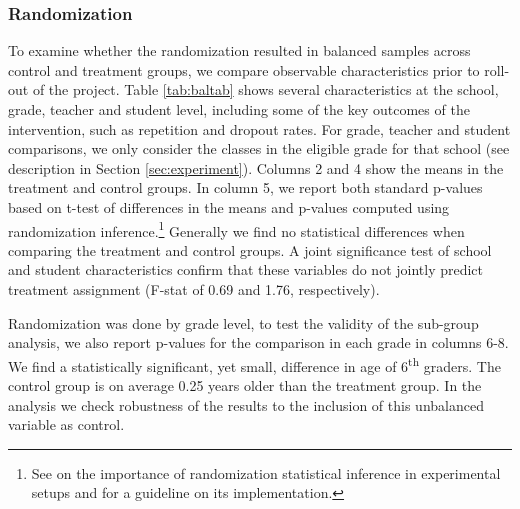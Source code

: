 \documentclass[11pt,a4paper]{article}
\begin{document}
\subsubsection*{Randomization}
To examine whether the randomization resulted in balanced samples across control and treatment groups, we compare observable characteristics prior to roll-out of the project. Table \ref{tab:baltab} shows several characteristics at the school, grade, teacher and student level, including some of the key outcomes of the intervention, such as repetition and dropout rates. For grade, teacher and student comparisons, we only consider the classes in the eligible grade for that school (see description in Section \ref{sec:experiment}). Columns 2 and 4 show the means in the treatment and control groups. In column 5, we report both standard p-values based on t-test of differences in the means and p-values computed using randomization inference.\footnote{See \cite{young2019channelling} on the importance of randomization statistical inference in experimental setups and \cite{hess2017randomization} for a guideline on its implementation.} Generally we find no statistical differences when comparing the treatment and control groups. A joint significance test of school and student characteristics confirm that these variables do not jointly predict treatment assignment (F-stat of 0.69 and 1.76, respectively).

Randomization was done by grade level, to test the validity of the sub-group analysis, we also report p-values for the comparison in each grade in columns 6-8. We find a statistically significant, yet small, difference in age of 6\textsuperscript{th} graders. The control group is on average 0.25 years older than the treatment group. In the analysis we check robustness of the results to the inclusion of this unbalanced variable as control.
\end{document}
